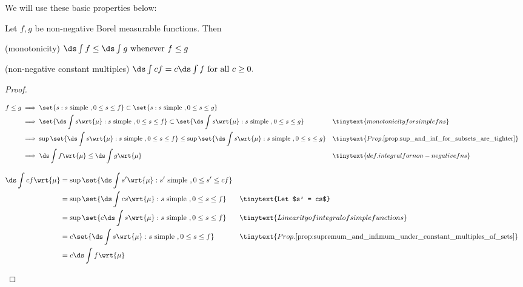 \documentclass{article} %
\newif\ifActive
\begin{document}

We will use these basic properties below:
\begin{proposition}
Let $f,g$ be non-negative Borel measurable functions. Then
\begin{alphabate}
\item (monotonicity) $\ds\int f \leq \ds\int g \text{ whenever } f \leq g$
\item (non-negative constant multiples) $\ds\int cf = c \ds\int f \text{ for all } c \geq 0.$	
\end{alphabate}
\label{prop:properties_of_integrals_of_non_negative_borel_measurable_functions}
\end{proposition}

\begin{proof}
\begin{alphabate}
\item 
\ifActive
\textbf{Workshop exercise: Prove monotonicity.}
\else 
	\begin{align*}
	f \leq g & \implies \set{s : s \text{ simple } , 0 \leq s \leq f} \subset \set{s:  s \text{ simple } , 0 \leq s \leq g} \\
	& \implies	\set{ \ds\int s \wrt{\mu}  :   s \text{ simple } , 0 \leq s \leq f} \subset \set{ \ds\int s \wrt{\mu} :  s \text{ simple } , 0 \leq s \leq g} && \tinytext{monotonicity for simple fns} \\
	& \implies \sup \set{ \ds\int s \wrt{\mu}  :  s \text{ simple } , 0 \leq s \leq f} \leq  \sup \set{ \ds\int s \wrt{\mu} :   s \text{ simple } , 0 \leq s \leq g} && \tinytext{Prop. \ref{prop:sup_and_inf_for_subsets_are_tighter}} \\
	& \implies \ds\int f \wrt{\mu} \leq \ds\int g \wrt{\mu} && \tinytext{def. integral for non-negative fns}
	\end{align*}
\fi 
\item 
\begin{align*}
\ds\int c f \wrt{\mu} &= \sup \set{\ds\int s' \wrt{\mu} : s' \text{ simple } , 0 \leq s' \leq cf} \\
&=  \sup  \set{\ds\int cs \wrt{\mu}   : s\text{ simple } , 0 \leq s \leq f} && \tinytext{Let $s' = cs$} \\
&= \sup  \set{c \ds\int s \wrt{\mu}   : s\text{ simple } , 0 \leq s \leq f} && \tinytext{Linearity of integral of simple functions} \\
&= c \set{ \ds\int s \wrt{\mu}   : s\text{ simple } , 0 \leq s \leq f} && \tinytext{Prop. \ref{prop:supremum_and_infimum_under_constant_multiples_of_sets}}\\
&= c \ds\int f \wrt{\mu} 
\end{align*}
\end{alphabate}

\end{proof}
\end{document}
